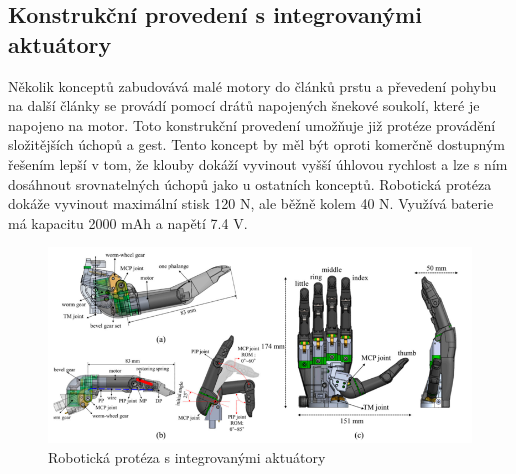 \documentclass[a4paper,12pt]{article}
\begin{document}
\subsection{Konstrukční provedení s integrovanými aktuátory}
Několik konceptů zabudovává malé motory do článků prstu a převedení pohybu na další články se provádí pomocí drátů napojených šnekové soukolí, které je napojeno na motor. Toto konstrukční provedení umožňuje již protéze provádění složitějších úchopů a gest. Tento koncept by měl být oproti komerčně dostupným řešením lepší v tom, že klouby dokáží vyvinout vyšší úhlovou rychlost a lze s ním dosáhnout srovnatelných úchopů jako u ostatních konceptů. Robotická protéza dokáže vyvinout maximální stisk 120 N, ale běžně kolem 40 N. Využívá baterie má kapacitu 2000 mAh a napětí 7.4 V.\cite{Jung}

\begin{figure}[hbp]
\centering
\includegraphics[scale=0.7]{figures/Infinger_actuator_schematics.PNG}
\caption{Robotická protéza s integrovanými aktuátory \cite{Jung}}
\end{figure}\break
\end{document}
